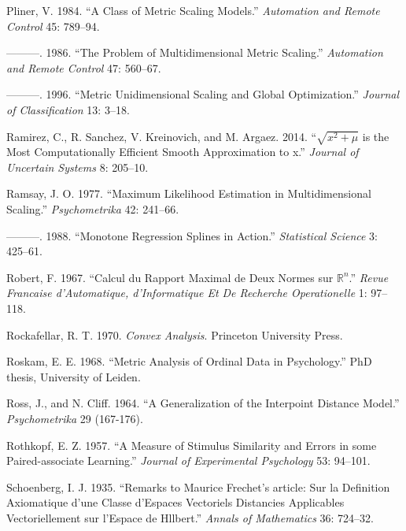\documentclass[
  12pt,
  letterpaper,
  DIV=11,
  numbers=noendperiod]{scrreprt}
\newlength{\cslhangindent}
\newenvironment{CSLReferences}[2] %
 {\begin{list}{}{%
  \setlength{\itemindent}{0pt}
  \setlength{\leftmargin}{0pt}
  \setlength{\parsep}{0pt}
  \ifodd #1
   \setlength{\leftmargin}{\cslhangindent}
   \setlength{\itemindent}{-1\cslhangindent}
  \fi
  \setlength{\itemsep}{#2\baselineskip}}}
 {\end{list}}
\theoremstyle{remark}
\begin{document}
\begin{CSLReferences}{1}{0}
Pliner, V. 1984. {``{A Class of Metric Scaling Models}.''}
\emph{Automation and Remote Control} 45: 789--94.

---------. 1986. {``{The Problem of Multidimensional Metric Scaling}.''}
\emph{Automation and Remote Control} 47: 560--67.

---------. 1996. {``{Metric Unidimensional Scaling and Global
Optimization}.''} \emph{Journal of Classification} 13: 3--18.

Ramirez, C., R. Sanchez, V. Kreinovich, and M. Argaez. 2014.
{``{\(\sqrt{x^2+\mu}\) is the Most Computationally Efficient Smooth
Approximation to \vert{}x\vert{}}.''} \emph{Journal of Uncertain
Systems} 8: 205--10.

Ramsay, J. O. 1977. {``{Maximum Likelihood Estimation in
Multidimensional Scaling}.''} \emph{Psychometrika} 42: 241--66.

---------. 1988. {``{Monotone Regression Splines in Action}.''}
\emph{Statistical Science} 3: 425--61.

Robert, F. 1967. {``{Calcul du Rapport Maximal de Deux Normes sur
\(\mathbb{R}^n\)}.''} \emph{Revue Francaise d'Automatique,
d'Informatique Et De Recherche Operationelle} 1: 97--118.

Rockafellar, R. T. 1970. \emph{Convex Analysis}. Princeton University
Press.

Roskam, E. E. 1968. {``{Metric Analysis of Ordinal Data in
Psychology}.''} PhD thesis, University of Leiden.

Ross, J., and N. Cliff. 1964. {``{A Generalization of the Interpoint
Distance Model}.''} \emph{Psychometrika} 29 (167-176).

Rothkopf, E. Z. 1957. {``{A Measure of Stimulus Similarity and Errors in
some Paired-associate Learning}.''} \emph{Journal of Experimental
Psychology} 53: 94--101.

Schoenberg, I. J. 1935. {``{Remarks to Maurice Frechet's article: Sur la
Definition Axiomatique d'une Classe d'Espaces Vectoriels Distancies
Applicables Vectoriellement sur l'Espace de Hllbert}.''} \emph{Annals of
Mathematics} 36: 724--32.


\end{CSLReferences}
\end{document}
